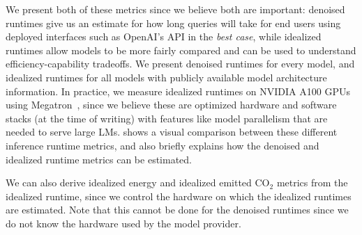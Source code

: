 We present both of these metrics since we believe both are important: denoised runtimes give us an estimate for how long queries will take for end users using deployed interfaces such as OpenAI's API in the \emph{best case}, while idealized runtimes allow models to be more fairly compared and can be used to understand efficiency-capability tradeoffs. 
We present denoised runtimes for every model, and idealized runtimes for all models with publicly available model architecture information.
In practice, we measure idealized runtimes on NVIDIA A100 GPUs using Megatron~\citep{shoeybi2019megatron}, since we believe these are optimized hardware and software stacks (at the time of writing) with features like model parallelism that are needed to serve large LMs.
 shows a visual comparison between these different inference runtime metrics, and also briefly explains how the denoised and idealized runtime metrics can be estimated. 

We can also derive idealized energy and idealized emitted CO$_2$ metrics from the idealized runtime, since we control the hardware on which the idealized runtimes are estimated.
Note that this cannot be done for the denoised runtimes since we do not know the hardware used by the model provider.